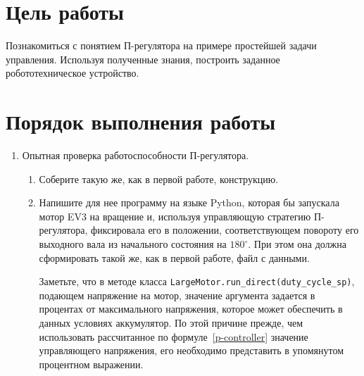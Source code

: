\documentclass[12pt,a4paper,openany]{extarticle}
\begin{document}
\newpage				 
\section{Цель работы}
\hspace*{\parindent}Познакомиться с понятием П-регулятора на примере простейшей задачи управления.
Используя полученные знания, построить заданное робототехническое устройство.

\section{Порядок выполнения работы}
\begin{enumerate}
	\item Опытная проверка работоспособности П-регулятора.
	\begin{enumerate}
		\item Соберите такую же, как в первой работе, конструкцию.
		\item Напишите для нее программу на языке Python, которая бы запускала мотор EV3 на вращение и, используя управляющую стратегию П-регулятора, фиксировала его в положении, соответствующем повороту его выходного вала из начального состояния на $180^\circ$\!\!.
		При этом она должна сформировать такой же, как в первой работе, файл с данными.
		
		Заметьте, что в методе класса \verb|LargeMotor.run_direct(duty_cycle_sp)|, подающем напряжение на мотор, значение аргумента задается в процентах от максимального напряжения, которое может обеспечить в данных условиях аккумулятор.
		По этой причине прежде, чем использовать рассчитанное по формуле~\eqref{p-controller} значение управляющего напряжения, его необходимо представить в упомянутом процентном выражении.
		

\end{enumerate}
\end{enumerate}
\end{document}
